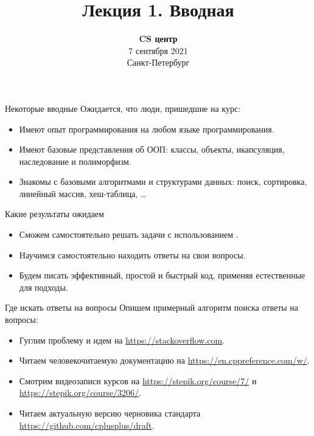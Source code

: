 \documentclass[aspectration=1610,t]{beamer}
\title{Лекция 1. Вводная}
\date{
   \textbf{CS центр}\\
   7 сентября 2021\\
   Санкт-Петербург
}
\begin{document}
\begin{frame}
  \titlepage
\end{frame}

\begin{frame}[fragile]{Некоторые вводные}
    Ожидается, что люди, пришедшие на курс:
    \begin{itemize}
        \item Имеют опыт программирования на любом языке программирования.
        \item Имеют базовые представления об ООП:
            классы, объекты, икапсуляция, наследование и полиморфизм.
        \item Знакомы с базовыми алгоритмами и структурами данных: 
            поиск, сортировка, линейный массив, хеш-таблица, \dots
    \end{itemize}
\end{frame}

\begin{frame}[fragile]{Какие результаты ожидаем}
    \begin{itemize}
        \item Сможем самостоятельно решать задачи с использованием \langcpp.
        \item Научимся самостоятельно находить ответы на свои вопросы.
        \item Будем писать эффективный, простой и быстрый код,
            применяя естественные для \langcpp подходы.
    \end{itemize}
\end{frame}

\begin{frame}[fragile]{Где искать ответы на вопросы}
    Опишем примерный алгоритм поиска ответы на вопросы:
    \begin{itemize}
        \item Гуглим проблему и идем на \url{https://stackoverflow.com}.
        \item Читаем человекочитаемую документацию на 
            \url{https://en.cppreference.com/w/}.
        \item Смотрим видеозаписи курсов на \url{https://stepik.org/course/7/} и 
            \url{https://stepik.org/course/3206/}.
        \item Читаем актуальную версию черновика стандарта 
            \url{https://github.com/cplusplus/draft}.
    \end{itemize}
\end{frame}
\end{document}
